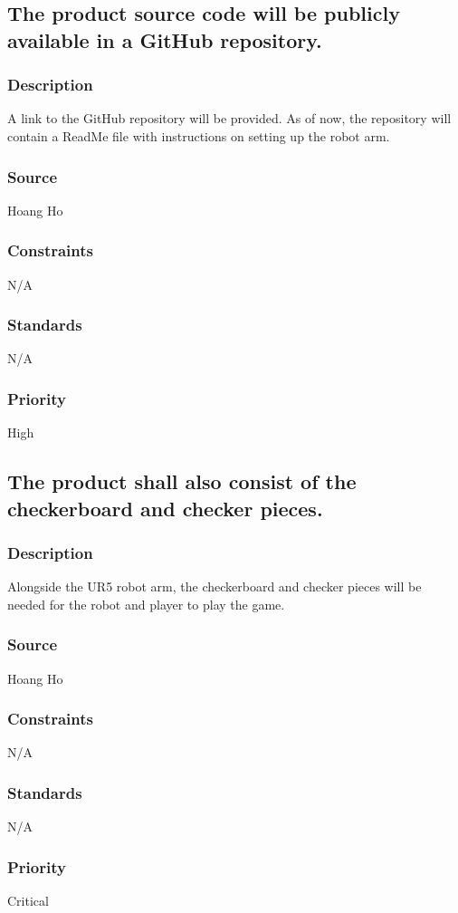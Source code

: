 \subsection{The product source code will be publicly available in a GitHub repository.}
\subsubsection{Description}
A link to the GitHub repository will be provided. As of now, the repository will contain a ReadMe file with instructions on setting up the robot arm.
\subsubsection{Source}
Hoang Ho
\subsubsection{Constraints}
N/A
\subsubsection{Standards}
N/A
\subsubsection{Priority}
High

\subsection{The product shall also consist of the checkerboard and checker pieces.}
\subsubsection{Description}
Alongside the UR5 robot arm, the checkerboard and checker pieces will be needed for the robot and player to play the game.
\subsubsection{Source}
Hoang Ho
\subsubsection{Constraints}
N/A
\subsubsection{Standards}
N/A
\subsubsection{Priority}
Critical

